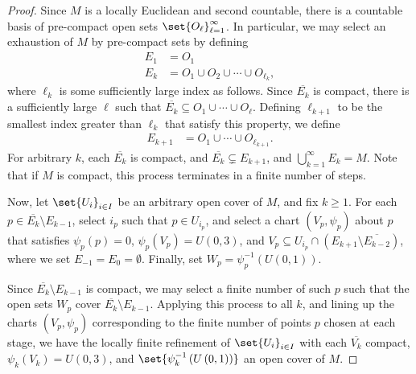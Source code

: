 \documentclass[10pt]{mypackage}
\begin{document}
\begin{proof}
  Since $M$ is a locally Euclidean and second countable, there is a countable basis of pre-compact open sets $\set{O_\ell}_{\ell=1}^{\infty}$. In particular, we may select an exhaustion of $M$ by pre-compact sets by defining
  \begin{align*}
    E_1 &= O_1\\
    E_{k} &= O_1\cup O_2\cup \cdots \cup O_{\ell_k},
  \end{align*}
  where $\ell_{k}$ is some sufficiently large index as follows. Since $ \overline{E_k} $ is compact, there is a sufficiently large $\ell$ such that $ \overline{E_k}\subseteq O_1\cup\cdots\cup O_{\ell}$. Defining $\ell_{k+1}$ to be the smallest index greater than $\ell_{k}$ that satisfy this property, we define
  \begin{align*}
    E_{k+1} &= O_1 \cup \cdots \cup O_{\ell_{k+1}}.
  \end{align*}
  For arbitrary $k$, each $ \overline{E_k} $ is compact, and $ \overline{E_k}\subsetneq E_{k+1} $, and $\bigcup_{k=1}^{\infty}E_k = M$. Note that if $M$ is compact, this process terminates in a finite number of steps.\newline

  Now, let $\set{U_{i}}_{i\in I}$ be an arbitrary open cover of $M$, and fix $k \geq 1$. For each $p\in \overline{E_k}\setminus E_{k-1}$, select $i_{p}$ such that $p\in U_{i_p}$, and select a chart $\left( V_p,\psi_p \right)$ about $p$ that satisfies $\psi_p(p) = 0$, $\psi_p\left( V_p \right) = U\left( 0,3 \right)$, and $V_{p} \subseteq U_{i_p}\cap \left( E_{k+1}\setminus \overline{E_{k-2}} \right)$, where we set $E_{-1} = E_{0} = \emptyset$. Finally, set $W_{p} = \psi_{p}^{-1}\left( U\left( 0,1 \right) \right)$.\newline

  Since $ \overline{E_k} \setminus E_{k-1} $ is compact, we may select a finite number of such $p$ such that the open sets $W_{p}$ cover $ \overline{E_k}\setminus E_{k-1} $. Applying this process to all $k$, and lining up the charts $\left( V_p,\psi_p \right)$ corresponding to the finite number of points $p$ chosen at each stage, we have the locally finite refinement of $\set{U_{i}}_{i\in I}$ with each $ \overline{V_k} $ compact, $ \psi_k\left( V_k \right) = U\left( 0,3 \right) $, and $\set{\psi_k^{-1}\left( U\left( 0,1 \right) \right)}$ an open cover of $M$.
\end{proof}
\end{document}
